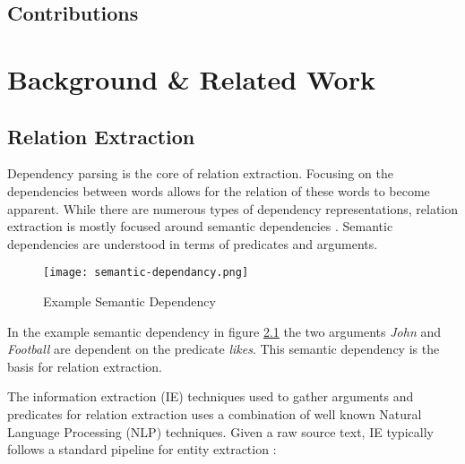 \documentclass[bsc,frontabs,twoside,singlespacing,parskip,deptreport]{infthesis}     %
\begin{document}
\section{Contributions}

\chapter{Background \& Related Work}


\section{Relation Extraction}\label{sec:IE-bg}
Dependency parsing is the core of relation extraction. Focusing on the dependencies between words allows for the relation of these words to become apparent.
While there are numerous types of dependency representations, relation extraction is mostly focused around semantic dependencies \cite{mcclosky2011event}.
Semantic dependencies are understood in terms of predicates and arguments.
\begin{figure}[H]
  \centering
  \texttt{[image: semantic-dependancy.png]}
  \caption{Example Semantic Dependency}
  \label{fig:semantic-dependancy}
\end{figure}

In the example semantic dependency in figure \ref{fig:semantic-dependancy} the two arguments \textit{John} and \textit{Football} are dependent
on the predicate \textit{likes}. This semantic dependency is the basis for relation extraction.


The information extraction (IE) techniques used to gather arguments and predicates for relation extraction uses a combination
of well known Natural Language Processing (NLP) techniques. 
Given a raw source text, IE typically follows a standard pipeline for entity extraction \cite{bontcheva2013twitie}:\\
\end{document}
